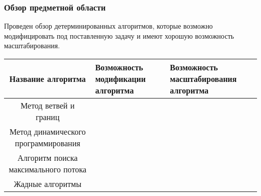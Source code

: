 
\begin{frame}
    \frametitle{Обзор предметной области}
    Проведен обзор детерминированных алгоритмов, которые возможно модифицировать под поставленную задачу и имеют хорошую возможность масштабирования.
    \begin{table}
        \begin{tabularx}{\textwidth}{  c | Y | Y }
            Название алгоритма                   & Возможность модификации алгоритма & Возможность масштабирования алгоритма \\
            \hline
            Метод ветвей и границ                &                          &                              \\
            Метод динамического программирования &                          &                              \\
            Алгоритм поиска максимального потока &                          &                              \\
            Жадные алгоритмы                     &                          &                              \\
        \end{tabularx}
    \end{table}

\end{frame}